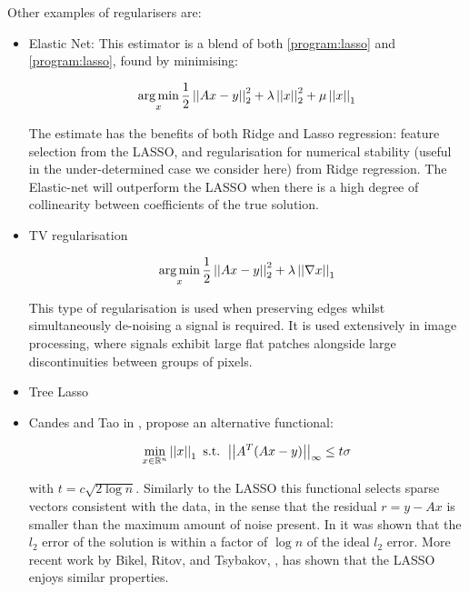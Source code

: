 
Other examples of regularisers are:

\begin{itemize}
\item Elastic Net: This estimator is a blend of both \eqref{program:lasso} and \eqref{program:lasso}, found by minimising:

\begin{equation}
\operatorname*{arg\,min}_x \frac{1}{2}\left|\left|Ax-y\right|\right|_2^2 + \lambda\left|\left|x\right|\right|_2^2 + \mu\left|\left|x\right|\right|_1
\label{program:enat}
\end{equation}

The estimate has the benefits of both Ridge and Lasso regression: feature selection from the LASSO, and regularisation for numerical stability (useful in the under-determined case we consider here) from Ridge regression. The Elastic-net will outperform the LASSO when there is a high degree of collinearity between coefficients of the true solution.

\item TV regularisation

\begin{equation}
\operatorname*{arg\,min}_x \frac{1}{2}\left|\left|Ax-y\right|\right|_2^2 +  \lambda\left|\left|\nabla x\right|\right|_1
\label{program:enat}
\end{equation}

This type of regularisation is used when preserving edges whilst simultaneously de-noising a signal is required. It is used extensively in image processing, where signals exhibit large flat patches alongside large discontinuities between groups of pixels.

\item Tree Lasso


\item Candes and Tao in \cite{candes2007dantzig}, propose an alternative  functional:

\begin{equation}
\min_{x \in {\mathbb{R}}^n} \left|\left|x\right|\right|_1 \text{ s.t. } \left|\left|A^T(Ax-y)\right|\right|_{\infty} \leq t\sigma
\end{equation}

with \(t = c\sqrt{2\log{n}}\). Similarly to the LASSO this functional selects sparse vectors consistent with the data, in the sense that the residual \(r = y - Ax\) is smaller than the maximum amount of noise present. In \cite{candes2007dantzig} it was shown that the \(l_2\) error of the solution is within a factor of \(\log{n}\) of the ideal \(l_2\) error. More recent work by Bikel, Ritov, and Tsybakov, \cite{bickel2009simultaneous}, has shown that the LASSO enjoys similar properties.
\end{itemize}


